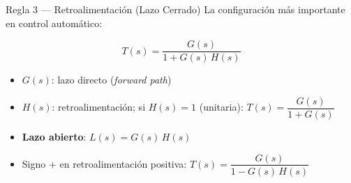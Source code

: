 \documentclass[aspectratio=169,xcolor=dvipsnames]{beamer}
\begin{document}
\begin{frame}{Regla 3 --- Retroalimentaci\'on (Lazo Cerrado)}
    La configuraci\'on m\'as importante en control autom\'atico:
    \vspace{0.3em}
    \begin{center}
    \end{center}
    \vspace{0.2em}
    \begin{equation}
        \boxed{T(s) = \frac{G(s)}{1 + G(s)\,H(s)}}
    \end{equation}
    \begin{itemize}
        \item \textbf{$G(s)$}: lazo directo (\textit{forward path})
        \item \textbf{$H(s)$}: retroalimentaci\'on; si $H(s)=1$ (unitaria): $T(s) = \dfrac{G(s)}{1+G(s)}$
        \item \textbf{Lazo abierto}: $L(s) = G(s)\,H(s)$
        \item Signo $+$ en retroalimentaci\'on positiva: $T(s) = \dfrac{G(s)}{1 - G(s)\,H(s)}$
    \end{itemize}
\end{frame}
\end{document}
